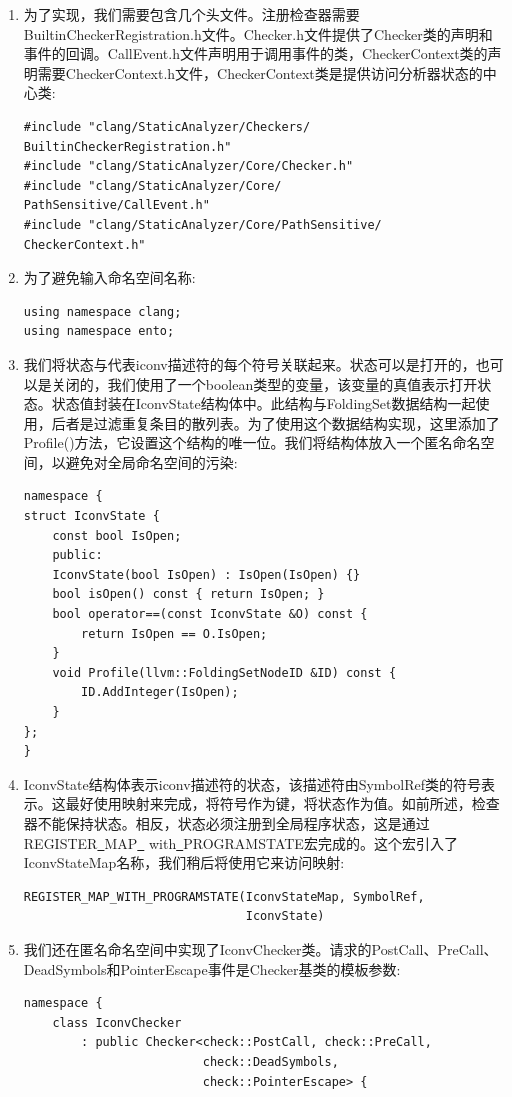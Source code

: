 \begin{enumerate}
\item 为了实现，我们需要包含几个头文件。注册检查器需要BuiltinCheckerRegistration.h文件。Checker.h文件提供了Checker类的声明和事件的回调。CallEvent.h文件声明用于调用事件的类，CheckerContext类的声明需要CheckerContext.h文件，CheckerContext类是提供访问分析器状态的中心类:
\begin{lstlisting}[caption={}]
#include "clang/StaticAnalyzer/Checkers/
BuiltinCheckerRegistration.h"
#include "clang/StaticAnalyzer/Core/Checker.h"
#include "clang/StaticAnalyzer/Core/
PathSensitive/CallEvent.h"
#include "clang/StaticAnalyzer/Core/PathSensitive/
CheckerContext.h"
\end{lstlisting}

\item 为了避免输入命名空间名称:
\begin{lstlisting}[caption={}]
using namespace clang;
using namespace ento;
\end{lstlisting}

\item 我们将状态与代表iconv描述符的每个符号关联起来。状态可以是打开的，也可以是关闭的，我们使用了一个boolean类型的变量，该变量的真值表示打开状态。状态值封装在IconvState结构体中。此结构与FoldingSet数据结构一起使用，后者是过滤重复条目的散列表。为了使用这个数据结构实现，这里添加了Profile()方法，它设置这个结构的唯一位。我们将结构体放入一个匿名命名空间，以避免对全局命名空间的污染:
\begin{lstlisting}[caption={}]
namespace {
struct IconvState {
	const bool IsOpen;
	public:
	IconvState(bool IsOpen) : IsOpen(IsOpen) {}
	bool isOpen() const { return IsOpen; }
	bool operator==(const IconvState &O) const {
		return IsOpen == O.IsOpen;
	}
	void Profile(llvm::FoldingSetNodeID &ID) const {
		ID.AddInteger(IsOpen);
	}
};
}
\end{lstlisting}

\item IconvState结构体表示iconv描述符的状态，该描述符由SymbolRef类的符号表示。这最好使用映射来完成，将符号作为键，将状态作为值。如前所述，检查器不能保持状态。相反，状态必须注册到全局程序状态，这是通过REGISTER\underline{~}MAP\underline{~} with\underline{~}PROGRAMSTATE宏完成的。这个宏引入了IconvStateMap名称，我们稍后将使用它来访问映射:
\begin{lstlisting}[caption={}]
REGISTER_MAP_WITH_PROGRAMSTATE(IconvStateMap, SymbolRef,
							   IconvState)
\end{lstlisting}

\item 我们还在匿名命名空间中实现了IconvChecker类。请求的PostCall、PreCall、DeadSymbols和PointerEscape事件是Checker基类的模板参数:
\begin{lstlisting}[caption={}]
namespace {
	class IconvChecker
		: public Checker<check::PostCall, check::PreCall,
						 check::DeadSymbols,
						 check::PointerEscape> {
\end{lstlisting}


\end{enumerate}
